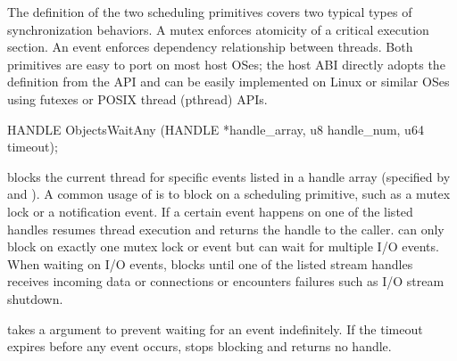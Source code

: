 The definition of the two scheduling primitives
covers two typical types of synchronization behaviors.
A mutex enforces atomicity of a critical
execution section.
An event enforces dependency relationship between
threads.
Both primitives are easy to port on most host OSes;
the host ABI directly adopts the definition from the \win{} API and can be easily implemented
on Linux or similar OSes using futexes or POSIX thread (pthread) APIs. 







\begin{paldef}
HANDLE ObjectsWaitAny (HANDLE *handle_array,
                       u8 handle_num, u64 timeout);
\end{paldef}


 blocks the current thread for specific events listed in
a handle array (specified by  and ).
A common usage of 
is to block on a scheduling primitive,
such as a mutex lock or a notification event.
If a certain event happens on one of the listed handles
 resumes thread execution
and returns the handle to the caller. 
 can only block on exactly one mutex lock or event but can wait for
multiple I/O events.
When waiting on I/O events,
 blocks until one of the listed stream handles receives incoming data or connections
or encounters failures such as I/O stream shutdown.


 takes a  argument to prevent waiting for an event indefinitely.
If the timeout expires before any event occurs,
 stops blocking
and returns no handle.


